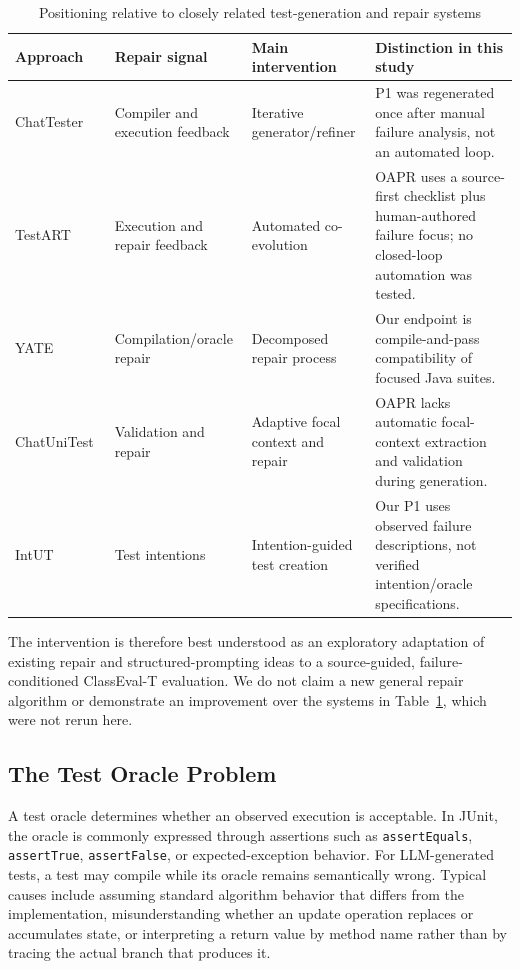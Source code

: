 \begin{table}[t]
\caption{Positioning relative to closely related test-generation and repair systems}
\label{tab:prior}
\centering\scriptsize
\begin{tabularx}{\textwidth}{@{}l l X X@{}}
\toprule
Approach & Repair signal & Main intervention & Distinction in this study \\
\midrule
ChatTester~\cite{yuan2024chattester} & Compiler and execution feedback & Iterative generator/refiner & P1 was regenerated once after manual failure analysis, not an automated loop. \\
TestART~\cite{gu2024testart} & Execution and repair feedback & Automated co-evolution & OAPR uses a source-first checklist plus human-authored failure focus; no closed-loop automation was tested. \\
YATE~\cite{konstantinou2025yate} & Compilation/oracle repair & Decomposed repair process & Our endpoint is compile-and-pass compatibility of focused Java suites. \\
ChatUniTest~\cite{chatunitest} & Validation and repair & Adaptive focal context and repair & OAPR lacks automatic focal-context extraction and validation during generation. \\
IntUT~\cite{intut} & Test intentions & Intention-guided test creation & Our P1 uses observed failure descriptions, not verified intention/oracle specifications. \\
\bottomrule
\end{tabularx}
\end{table}

The intervention is therefore best understood as an exploratory adaptation of existing repair and structured-prompting ideas to a source-guided, failure-conditioned ClassEval-T evaluation. We do not claim a new general repair algorithm or demonstrate an improvement over the systems in Table~\ref{tab:prior}, which were not rerun here.

\subsection{The Test Oracle Problem}
\label{subsec:oracle_problem}
A test oracle determines whether an observed execution is acceptable. In JUnit, the oracle is commonly expressed through assertions such as \texttt{assertEquals}, \texttt{assertTrue}, \texttt{assertFalse}, or expected-exception behavior. For LLM-generated tests, a test may compile while its oracle remains semantically wrong. Typical causes include assuming standard algorithm behavior that differs from the implementation, misunderstanding whether an update operation replaces or accumulates state, or interpreting a return value by method name rather than by tracing the actual branch that produces it.

